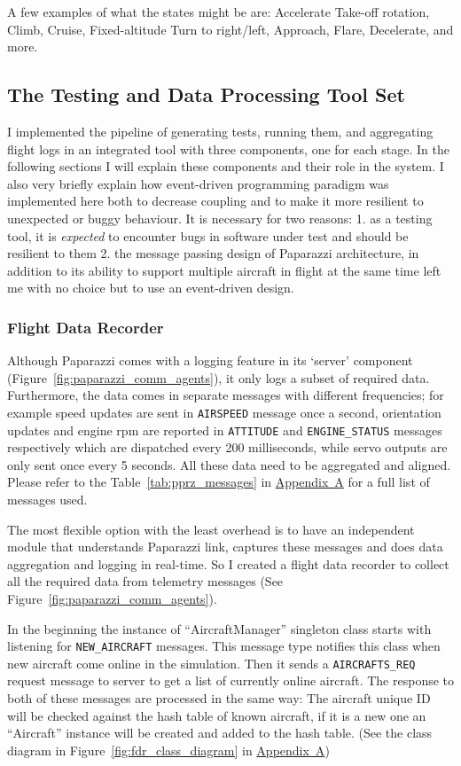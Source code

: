 A few examples of what the states might be are: Accelerate
Take-off rotation,
Climb,
Cruise,
Fixed-altitude Turn to right/left,
Approach,
Flare, 
Decelerate,
and more.

\subsection{The Testing and Data Processing Tool Set}\label{section:fuzzing_tool}
I implemented the pipeline of generating tests, running them, and aggregating flight logs in an integrated tool with three components, one for each stage. In the following sections I will explain these components and their role in the system. I also very briefly explain how event-driven programming paradigm was implemented here both to decrease coupling and to make it more resilient to unexpected or buggy behaviour. It is necessary for two reasons: 1. as a testing tool, it is \textit{expected} to encounter bugs in software under test and should be resilient to them 2. the message passing design of Paparazzi architecture, in addition to its ability to support multiple aircraft in flight at the same time left me with no choice but to use an event-driven design.


\subsubsection{Flight Data Recorder}
Although Paparazzi comes with a logging feature in its `server' component (Figure~\ref{fig:paparazzi_comm_agents}), it only logs a subset of required data. Furthermore, the data comes in separate messages with different frequencies; for example speed updates are sent in \verb|AIRSPEED| message once a second, orientation updates and engine rpm are reported in \verb|ATTITUDE| and \verb|ENGINE_STATUS| messages respectively which are dispatched every 200 milliseconds, while servo outputs are only sent once every 5 seconds. All these data need to be aggregated and aligned. Please refer to the Table~\ref{tab:pprz_messages} in \hyperref[appendixa]{Appendix~A} for a full list of messages used.

The most flexible option with the least overhead is to have an independent module that understands Paparazzi link, captures these messages and does data aggregation and logging in real-time. So I created a flight data recorder to collect all the required data from telemetry messages (See Figure~\ref{fig:paparazzi_comm_agents}).

In the beginning the instance of ``AircraftManager'' singleton class starts with listening for \verb|NEW_AIRCRAFT| messages. This message type notifies this class when new aircraft come online in the simulation. Then it sends a \verb|AIRCRAFTS_REQ| request message to server to get a list of currently online aircraft. The response to both of these messages are processed in the same way: The aircraft unique ID will be checked against the hash table of known aircraft, if it is a new one an ``Aircraft'' instance will be created and added to the hash table. (See the class diagram in Figure~\ref{fig:fdr_class_diagram} in \hyperref[appendixa]{Appendix~A})

